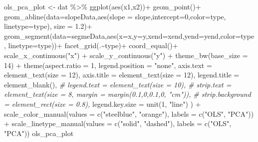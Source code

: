 \documentclass[print]{nuthesis}
\newenvironment{Shaded}{\begin{snugshade}}{\end{snugshade}}
\newcommand{\AttributeTok}[1]{\textcolor[rgb]{0.77,0.63,0.00}{#1}}
\newcommand{\CommentTok}[1]{\textcolor[rgb]{0.56,0.35,0.01}{\textit{#1}}}
\newcommand{\DecValTok}[1]{\textcolor[rgb]{0.00,0.00,0.81}{#1}}
\newcommand{\FloatTok}[1]{\textcolor[rgb]{0.00,0.00,0.81}{#1}}
\newcommand{\FunctionTok}[1]{\textcolor[rgb]{0.00,0.00,0.00}{#1}}
\newcommand{\NormalTok}[1]{#1}
\newcommand{\OtherTok}[1]{\textcolor[rgb]{0.56,0.35,0.01}{#1}}
\newcommand{\SpecialCharTok}[1]{\textcolor[rgb]{0.00,0.00,0.00}{#1}}
\newcommand{\StringTok}[1]{\textcolor[rgb]{0.31,0.60,0.02}{#1}}
\begin{document}
\begin{Shaded}
\begin{Highlighting}[]
\NormalTok{ols\_pca\_plot }\OtherTok{\textless{}{-}}\NormalTok{ dat }\SpecialCharTok{\%\textgreater{}\%}
\FunctionTok{ggplot}\NormalTok{(}\FunctionTok{aes}\NormalTok{(x1,x2))}\SpecialCharTok{+}
  \FunctionTok{geom\_point}\NormalTok{()}\SpecialCharTok{+}
  \FunctionTok{geom\_abline}\NormalTok{(}\AttributeTok{data=}\NormalTok{slopeData,}\FunctionTok{aes}\NormalTok{(}\AttributeTok{slope =}\NormalTok{ slope,}\AttributeTok{intercept=}\DecValTok{0}\NormalTok{,}\AttributeTok{color=}\NormalTok{type, }\AttributeTok{linetype=}\NormalTok{type), }\AttributeTok{size =} \FloatTok{1.2}\NormalTok{)}\SpecialCharTok{+}
  \FunctionTok{geom\_segment}\NormalTok{(}\AttributeTok{data=}\NormalTok{segmeData,}\FunctionTok{aes}\NormalTok{(}\AttributeTok{x=}\NormalTok{x,}\AttributeTok{y=}\NormalTok{y,}\AttributeTok{xend=}\NormalTok{xend,}\AttributeTok{yend=}\NormalTok{yend,}\AttributeTok{color=}\NormalTok{type, }\AttributeTok{linetype=}\NormalTok{type))}\SpecialCharTok{+}
  \FunctionTok{facet\_grid}\NormalTok{(.}\SpecialCharTok{\textasciitilde{}}\NormalTok{type)}\SpecialCharTok{+}
  \FunctionTok{coord\_equal}\NormalTok{()}\SpecialCharTok{+}
  \FunctionTok{scale\_x\_continuous}\NormalTok{(}\StringTok{"x"}\NormalTok{) }\SpecialCharTok{+}
  \FunctionTok{scale\_y\_continuous}\NormalTok{(}\StringTok{"y"}\NormalTok{) }\SpecialCharTok{+}
  \FunctionTok{theme\_bw}\NormalTok{(}\AttributeTok{base\_size =} \DecValTok{14}\NormalTok{) }\SpecialCharTok{+}
  \FunctionTok{theme}\NormalTok{(}\AttributeTok{aspect.ratio =} \DecValTok{1}\NormalTok{,}
        \AttributeTok{legend.position =} \StringTok{"none"}\NormalTok{,}
        \AttributeTok{axis.text    =} \FunctionTok{element\_text}\NormalTok{(}\AttributeTok{size =} \DecValTok{12}\NormalTok{),}
        \AttributeTok{axis.title   =} \FunctionTok{element\_text}\NormalTok{(}\AttributeTok{size =} \DecValTok{12}\NormalTok{),}
        \AttributeTok{legend.title =} \FunctionTok{element\_blank}\NormalTok{(),}
        \CommentTok{\# legend.text  = element\_text(size = 10),}
        \CommentTok{\# strip.text = element\_text(size = 8, margin = margin(0.1,0,0.1,0, "cm")),}
        \CommentTok{\# strip.background = element\_rect(size = 0.8),}
        \AttributeTok{legend.key.size =} \FunctionTok{unit}\NormalTok{(}\DecValTok{1}\NormalTok{, }\StringTok{"line"}\NormalTok{)}
\NormalTok{        ) }\SpecialCharTok{+}
  \FunctionTok{scale\_color\_manual}\NormalTok{(}\AttributeTok{values =} \FunctionTok{c}\NormalTok{(}\StringTok{"steelblue"}\NormalTok{, }\StringTok{"orange"}\NormalTok{), }\AttributeTok{labels =} \FunctionTok{c}\NormalTok{(}\StringTok{"OLS"}\NormalTok{, }\StringTok{"PCA"}\NormalTok{)) }\SpecialCharTok{+}
  \FunctionTok{scale\_linetype\_manual}\NormalTok{(}\AttributeTok{values =} \FunctionTok{c}\NormalTok{(}\StringTok{"solid"}\NormalTok{, }\StringTok{"dashed"}\NormalTok{), }\AttributeTok{labels =} \FunctionTok{c}\NormalTok{(}\StringTok{"OLS"}\NormalTok{, }\StringTok{"PCA"}\NormalTok{))}
\NormalTok{ols\_pca\_plot}
\end{Highlighting}
\end{Shaded}
\end{document}
